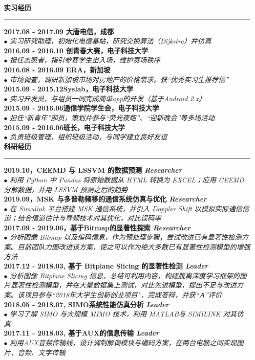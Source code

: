 \documentclass[a4paper,11pt,final]{memoir}
\newcommand{\myThemeColor}{RoyalBlue}
\newcommand{\SmallSep}{\vspace{0.9em}}
\newcommand{\CVSection}[1]
	{\Large\textbf{#1}\par
	\vspace{0.2cm}\normalsize\normalfont}
\newcommand{\CVItem}[1]
	{\textbf{\color{\myThemeColor} #1}}
\begin{document}
\begin{CJK*}{UTF8}{gbsn}
\CVSection{实习经历}
\hrule
\SmallSep
\CVItem{2017.08 - 2017.09 \hfill 大唐电信，成都}\\
\textit{$\bullet$ 实习研究助理，初始化电信基站，研究交换算法（Dijkstra）并仿真}
\\
\CVItem{2016.09 - 2016.10 \hfill 创青春大赛，电子科技大学}\\
\textit{$\bullet$ 担任志愿者，指引参赛学生出入场，维护赛场秩序}
\\
\CVItem{2016.08 - 2016.09 \hfill ERA，新加坡}\\
\textit{$\bullet$ 市场调查，调研新加坡市场对房地产的价格需求。获“优秀实习生推荐信”} 
\\
\CVItem{2015.09 - 2015.12\hfill Syslab，电子科技大学}\\
\textit{$\bullet$ 实习开发员，与组员一同完成简单app的开发（基于Android 2.x）}
\\
\CVItem{2015.09 - 2016.06\hfill 通信学院学生会，电子科技大学}\\
\textit{$\bullet$ 担任“新青年”部员，策划并参与“荧光夜跑”、“迎新晚会”等多场活动}
\\
\CVItem{2015.09 - 2016.06\hfill 班长，电子科技大学}\\
\textit{$\bullet$ 负责班级管理，组织班级活动，与同学建立良好友谊}
\\

\CVSection{科研经历}
\hrule
\SmallSep
\CVItem{2019.10，CEEMD 与 LSSVM 的数据预测 \hfill \emph{Researcher}}\\
\textit{$\bullet$ 利用 Python 中 Pandas 将原始数据从 HTML 转换为 EXCEL；应用 CEEMD 分解数据，并用 LSSVM 预测之后的趋势} 
\\
\CVItem{2019.09，MSK 与多普勒频移的通信系统仿真与优化 \hfill \emph{Researcher}}\\
\textit{$\bullet$ 在 Simulink 平台搭建 MSK 通信系统，并引入 Doppler Shift 以模拟实际通信信道；结合信道估计与导频技术对其优化，对比误码率} 
\\
\CVItem{2017.09 - 2019.06，基于Bitmap的显著性探索 \hfill \emph{Researcher}}\\
\textit{$\bullet$ 分析图像 Bitmap 以及编码信息，作为预处理步骤，尝试改进已有显著性检测方案。目前团队力图改进该方案，使之可以作为绝大多数已有显著性检测模型的增强方法} 
\\
\CVItem{2017.12 - 2018.03, 基于 Bitplane Slicing 的显著性检测 \hfill \emph{Leader}}\\
\textit{$\bullet$ 分析图像 Bitplane Slicing 信息，总结可利用内容，构建脱离深度学习框架的图片显著性检测模型，并在大量数据集上测试，对比先进模型，提出不足与改进方案。该项目参与“2018年大学生创新创业项目”，完成答辩，并获“\textbf{A}”评价} 
\\
\CVItem{2018.05 - 2018.07, SIMO系统性能仿真分析 \hfill \emph{Leader}}\\
\textit{$\bullet$ 学习了解 SIMO 与大规模 MIMO 技术，利用 MATLAB与 SIMILINK 对其仿真} 
\\
\CVItem{2017.11 - 2018.03, 基于AUX的信息传输 \hfill \emph{Leader}}\\
\textit{$\bullet$ 利用AUX音频传输线，设计调制解调模块与编码方案，在两台电脑之间实现图片、音频、文字传输}
\\


\end{CJK*}
\end{document}
